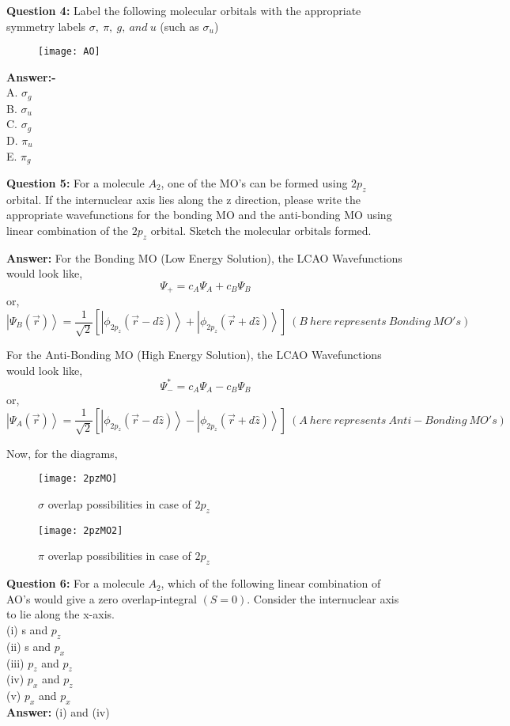 \documentclass[12pt]{article}
\begin{document}
	\textbf{Question 4: } Label the following molecular orbitals with the appropriate symmetry labels $\sigma,\ \pi,\ g,\ and\ u$ (such as $\sigma_{u}$)
	
	\begin{figure}[H]
		\centering
		\texttt{[image: AO]}
		\caption{}
		\label{figure:AO}
	\end{figure}

	\textbf{Answer:- }\\
	A. $\sigma_{g}$\\
	B. $\sigma_{u}$\\
	C. $\sigma_{g}$\\
	D. $\pi_{u}$\\
	E. $\pi_{g}$
	
	\textbf{Question 5: }For a molecule $A_{2}$, one of the MO’s can be formed using $2p_{z}$ orbital. If the internuclear 
	axis lies along the z direction, please write the appropriate wavefunctions for the bonding 
	MO and the anti-bonding MO using linear combination of the $2p_{z}$ orbital. Sketch the 
	molecular orbitals formed.
	
	\textbf{Answer: }For the Bonding MO (Low Energy Solution), the LCAO Wavefunctions would look like,
	$$\Psi_{+} = c_{A}\Psi_{A} + c_{B}\Psi_{B}$$
	or,
	$$\left| \Psi_{B}(\vec{r}) \right> = \dfrac{1}{\sqrt{2}} \left[ \left| \phi_{2p_{z}} (\vec{r} - d\hat{z})\right> + \left| \phi_{2p_{z}} (\vec{r} + d\hat{z})\right> \right]\ (B\ here\ represents\ Bonding\ MO's)$$
	
	For the Anti-Bonding MO (High Energy Solution), the LCAO Wavefunctions would look like,
	$$\Psi^{*}_{-} = c_{A}\Psi_{A} - c_{B}\Psi_{B}$$
	or,
	$$\left| \Psi_{A}(\vec{r}) \right> = \dfrac{1}{\sqrt{2}} \left[ \left| \phi_{2p_{z}} (\vec{r} - d\hat{z})\right> - \left| \phi_{2p_{z}} (\vec{r} + d\hat{z})\right> \right]\ (A\ here\ represents\ Anti-Bonding\ MO's)$$
	
	Now, for the diagrams,
	
	\begin{figure}[H]
		\centering
		\texttt{[image: 2pzMO]}
		\caption{$\sigma$ overlap possibilities in case of $2p_{z}$}
		\label{figure:2pz1}
	\end{figure}

	\begin{figure}[H]
		\centering
		\texttt{[image: 2pzMO2]}
		\caption{$\pi$ overlap possibilities in case of $2p_{z}$}
		\label{figure:2p21}
	\end{figure}

	\textbf{Question 6: } For a molecule $A_{2}$, which of the following linear combination of AO's would give a zero 
	overlap-integral $(S=0)$. Consider the internuclear axis to lie along the x-axis.\\
	(i) s and $p_{z}$\\ 
	(ii) s and $p_{x}$ \\
	(iii) $p_{z}$ and $p_{z}$ \\
	(iv) $p_{x}$ and $p_{z}$\\ 
	(v) $p_{x}$ and $p_{x}$\\
	
	\textbf{Answer: }(i) and (iv)
\end{document}
